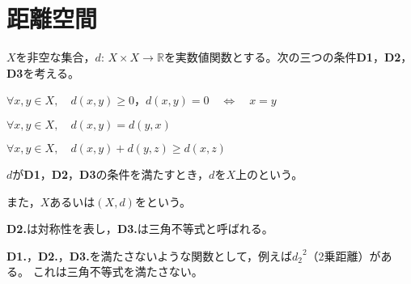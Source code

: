 \documentclass[uplatex]{jsarticle}
\begin{document}
\fi

\section{距離空間}

\begin{teigi}[距離空間]
    $X$を非空な集合，$d: \, X \times X \to \mathbb{R}$を実数値関数とする。次の三つの条件{\bf D1}，{\bf D2}，{\bf D3}を考える。
    
     $\forall x, y \in X, \quad d(x,y) \ge 0$，\qquad $d(x,y) = 0 \quad \Longleftrightarrow \quad x = y$
    
     $\forall x, y \in X, \quad d(x,y) = d(y,x)$
    
     $\forall x, y \in X, \quad d(x,y) + d(y,z) \ge d(x,z)$
    
    $d$が{\bf D1}，{\bf D2}，{\bf D3}の条件を満たすとき，$d$を$X$上のという。

    また，$X$あるいは$(X,d)$をという。
\end{teigi}

{\bf D2.}は対称性を表し，{\bf D3.}は三角不等式と呼ばれる。

{\bf D1.}，{\bf D2.}，{\bf D3.}を満たさないような関数として，例えば${d_{2}}^{2}$（2乗距離）がある。
これは三角不等式を満たさない。
\end{document}
